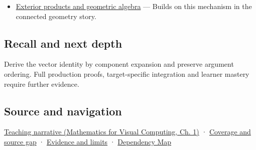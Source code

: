 \begin{itemize}
\tightlist
\item
  \hyperref[appendix-e1960925d1b8]{Exterior products and geometric algebra} --- Builds on this mechanism in the connected geometry story.
\end{itemize}

\subsection{Recall and next depth}\label{appendix-5caa058bd9c7-recall-and-next-depth}

Derive the vector identity by component expansion and preserve argument ordering. Full production proofs, target-specific integration and learner mastery require further evidence.

\subsection{Source and navigation}\label{appendix-5caa058bd9c7-source-and-navigation}

\href{../02-Mathematics-for-Visual-Computing/main.pdf\#nameddest=01-foundations-i-ch017-signed-volume-extends-the-same-idea-into-space}{Teaching narrative (Mathematics for Visual Computing, Ch. 1)} · \hyperref[appendix-fd090d982a15-phase-6---parts-501-600]{Coverage and source gap} · \hyperref[appendix-a103e7846d21-phase-6---source-analysis-and-verification]{Evidence and limits} · \hyperref[appendix-4ad47bdd269a]{Dependency Map}
